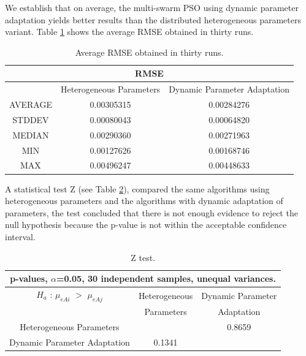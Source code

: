 \documentclass[graybox]{svmult}
\begin{document}
We establish that on average, the multi-swarm PSO using dynamic parameter adaptation yields better results than the distributed heterogeneous parameters variant. Table \ref{tab:rmse} shows the average RMSE obtained in thirty runs.


\begin{table}[htbp]
    \caption{Average RMSE obtained in thirty runs.} 
    \label{tab:rmse}
    \centering
    \setlength{\tabcolsep}{8pt}
    \begin{tabular}{|c|c|c|}      \hline
      \multicolumn{3}{|c|}{RMSE} \\ \hline
      & {Heterogeneous Parameters}  & {  Dynamic Parameter Adaptation} \\ \hline
    AVERAGE   & 0.00305315 & 0.00284276 \\ \hline
    STDDEV    & 0.00080043 & 0.00064820 \\ \hline   
    MEDIAN    & 0.00290360 & 0.00271963 \\ \hline 
    MIN       & 0.00127626 & 0.00168746 \\ \hline   
    MAX       & 0.00496247 & 0.00448633 \\ \hline    
   \end{tabular}
\end{table}

A statistical test Z (see Table \ref{tab:ztest}), compared the same algorithms using heterogeneous parameters and the algorithms with dynamic adaptation of parameters, the test concluded that there is not enough evidence to reject the null hypothesis because the p-value is not within the acceptable confidence interval.

\begin{table}[htbp] 
  \caption{Z test.}
  \label{tab:ztest}
  \centering
  \setlength{\tabcolsep}{5pt}
  \begin{tabular}{|c|c|c|}  
  \hline
    \multicolumn{3}{|c|}{  p-values, $\alpha$=0.05, 30 independent samples,  unequal variances.}  \\ [1ex] \hline
    $H_a$ : $\mu_{eAi}$ $>$ $\mu_{eAj}$ &  Heterogeneous  & Dynamic Parameter   \\   
                                        & Parameters      &  Adaptation  \\   \hline
            Heterogeneous Parameters    & \cellcolor{lightgray}    & 0.8659  \\  \hline
         Dynamic Parameter Adaptation   &   0.1341  & \cellcolor{lightgray} \\ \hline    
  \end{tabular}
\end{table}
\end{document}
